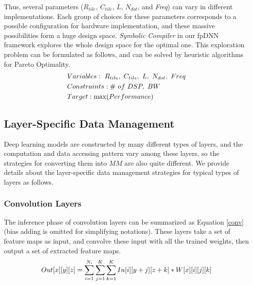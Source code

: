 \documentclass{acm_proc_article-sp-copy}
\begin{document}
\vspace{-10pt}Thus, several parameters ($R_{tile}$, $C_{tile}$, $L$, $N_{dot}$, and \emph{Freq}) can vary in different implementations. Each group of choices for these parameters corresponds to a possible configuration for hardware implementation, and these massive possibilities form a huge design space. \emph{Symbolic Compiler} in our fpDNN framework explores the whole design space for the optimal one. This exploration problem can be formulated as follows, and can be solved by heuristic algorithms for Pareto Optimality.
\vspace{-5pt}
\begin{equation}
\centering
\begin{split}
&Variables:\ R_{tile},\ C_{tile},\ L,\ N_{dot},\ Freq \\
&Constraints: \#\ of\ DSP,\ BW \\
&Target: \max(Performance)
\end{split}
\end{equation}


\subsection{Layer-Specific Data Management}
Deep learning models are constructed by many different types of layers, and the computation and data accessing pattern vary among these layers, so the strategies for converting them into $MM$ are also quite different. We provide details about the layer-specific data management strategies for typical types of layers as follows. 

\subsubsection{Convolution Layers}
The inference phase of convolution layers can be summarized as Equation \ref{conv} (bias adding is omitted for simplifying notations). These layers take a set of feature maps as input, and convolve these input with all the trained weights, then output a set of extracted feature maps.
\vspace{-8pt}
\begin{equation}
\centering
Out[x][y][z]=\sum_{i=1}^{N_i}\sum_{j=1}^{K}\sum_{k=1}^{K}In[i][y+j][z+k]*W[x][i][j][k]
\label{conv}
\end{equation}
\end{document}
